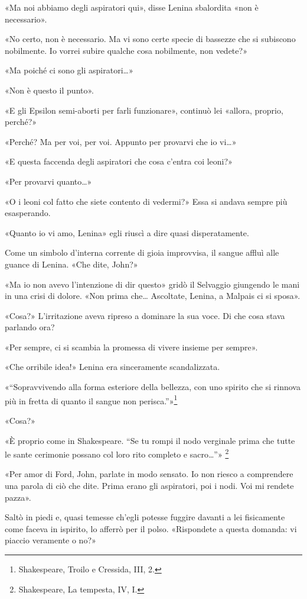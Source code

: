 \documentclass[
a5paper, %
10pt, %
twoside, 
onecolumn, %
openany, %
]{memoir}
\begin{document}
«Ma noi abbiamo degli aspiratori qui», disse Lenina sbalordita «non è necessario».

«No certo, non è necessario. Ma vi sono certe specie di bassezze che si subiscono nobilmente. Io vorrei subire qualche cosa nobilmente, non vedete?»

«Ma poiché ci sono gli aspiratori…»

«Non è questo il punto».

«E gli Epsilon semi-aborti per farli funzionare», continuò lei «allora, proprio, perché?»

«Perché? Ma per voi, per voi. Appunto per provarvi che io vi…»

«E questa faccenda degli aspiratori che cosa c’entra coi leoni?»

«Per provarvi quanto…»

«O i leoni col fatto che siete contento di vedermi?» Essa si andava sempre più esasperando.

«Quanto io vi amo, Lenina» egli riuscì a dire quasi disperatamente.

Come un simbolo d’interna corrente di gioia improvvisa, il sangue affluì alle guance di Lenina. «Che dite, John?»

«Ma io non avevo l’intenzione di dir questo» gridò il Selvaggio giungendo le mani in una crisi di dolore. «Non prima che… Ascoltate, Lenina, a Malpais ci si sposa».

«Cosa?» L’irritazione aveva ripreso a dominare la sua voce. Di che cosa stava parlando ora?

«Per sempre, ci si scambia la promessa di vivere insieme per sempre».

«Che orribile idea!» Lenina era sinceramente scandalizzata.

«“Sopravvivendo alla forma esteriore della bellezza, con uno spirito che si rinnova più in fretta di quanto il sangue non perisca.”»\footnote{Shakespeare, Troilo e Cressida, III, 2.}

«Cosa?»

«È proprio come in Shakespeare. “Se tu rompi il nodo verginale prima che tutte le sante cerimonie possano col loro rito completo e sacro…”» \footnote{Shakespeare, La tempesta, IV, I.}

«Per amor di Ford, John, parlate in modo sensato. Io non riesco a comprendere una parola di ciò che dite. Prima erano gli aspiratori, poi i nodi. Voi mi rendete pazza».

Saltò in piedi e, quasi temesse ch’egli potesse fuggire davanti a lei fisicamente come faceva in ispirito, lo afferrò per il polso. «Rispondete a questa domanda: vi piaccio veramente o no?»
\end{document}
